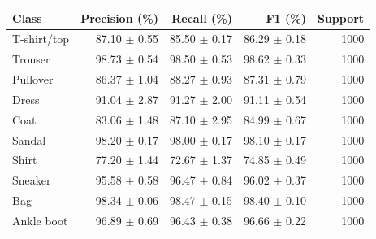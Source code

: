\begin{tabular}{lrrrr}
\toprule
Class & Precision (\%) & Recall (\%) & F1 (\%) & Support \\
\midrule
T-shirt/top & 87.10 $\pm$ 0.55 & 85.50 $\pm$ 0.17 & 86.29 $\pm$ 0.18 & 1000 \\
Trouser & 98.73 $\pm$ 0.54 & 98.50 $\pm$ 0.53 & 98.62 $\pm$ 0.33 & 1000 \\
Pullover & 86.37 $\pm$ 1.04 & 88.27 $\pm$ 0.93 & 87.31 $\pm$ 0.79 & 1000 \\
Dress & 91.04 $\pm$ 2.87 & 91.27 $\pm$ 2.00 & 91.11 $\pm$ 0.54 & 1000 \\
Coat & 83.06 $\pm$ 1.48 & 87.10 $\pm$ 2.95 & 84.99 $\pm$ 0.67 & 1000 \\
Sandal & 98.20 $\pm$ 0.17 & 98.00 $\pm$ 0.17 & 98.10 $\pm$ 0.17 & 1000 \\
Shirt & 77.20 $\pm$ 1.44 & 72.67 $\pm$ 1.37 & 74.85 $\pm$ 0.49 & 1000 \\
Sneaker & 95.58 $\pm$ 0.58 & 96.47 $\pm$ 0.84 & 96.02 $\pm$ 0.37 & 1000 \\
Bag & 98.34 $\pm$ 0.06 & 98.47 $\pm$ 0.15 & 98.40 $\pm$ 0.10 & 1000 \\
Ankle boot & 96.89 $\pm$ 0.69 & 96.43 $\pm$ 0.38 & 96.66 $\pm$ 0.22 & 1000 \\
\bottomrule
\end{tabular}
